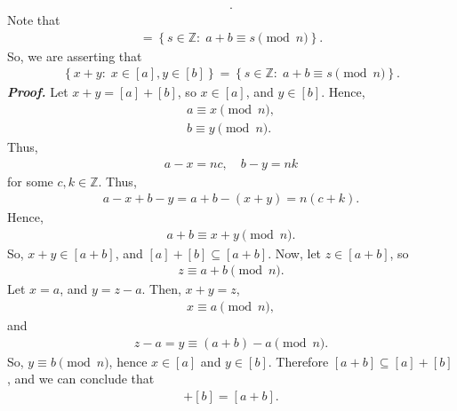 \documentclass{report}
\begin{document}
\begin{itemize}
\begin{align*}
            .\end{align*}
            Note that 
            \begin{align*}
                [a + b] = \left\{s \in \mathbb{Z}:\; a + b \equiv s \pmod{n}\right\}
            .\end{align*}
            So, we are asserting that 
            \begin{align*}
                \left\{x + y:\; x \in [a], y \in [b]\right\} = \left\{s \in \mathbb{Z}:\; a + b \equiv s \pmod{n}\right\}
            .\end{align*}
            \bigbreak \noindent 
            \textbf{\textit{Proof.}} Let $x+y = [a] + [b]$, so $x \in [a]$, and $y \in [b]$. Hence, 
            \begin{align*}
                a \equiv x \pmod{n}, \\
                b \equiv y \pmod{n}
            .\end{align*}
            Thus,
            \begin{align*}
                a - x = nc, \quad b - y = nk
            \end{align*}
            for some $c,k \in \mathbb{Z}$. Thus,
            \begin{align*}
                a - x + b -y = a+b-(x+y) = n(c+k)
            .\end{align*}
            Hence, 
            \begin{align*}
                a+b \equiv x+y \pmod{n}
            .\end{align*}
            So, $x+y \in [a+b]$, and $[a] + [b] \subseteq [a+b]$. Now, let $z \in [a+b]$, so
            \begin{align*}
                z \equiv a + b \pmod{n}
            .\end{align*}
            Let $x = a$, and $y = z-a$. Then, $x + y = z$, 
            \begin{align*}
                x \equiv a \pmod{n}
            ,\end{align*}
            and 
            \begin{align*}
                z-a = y \equiv (a+b) - a \pmod{n}
            .\end{align*}
            So, $y \equiv b \pmod{n}$, hence $x\in[a]$ and $y \in [b]$. Therefore $[a+b] \subseteq [a] + [b]$, and we can conclude that
            \begin{align*}
                [a] + [b] = [a+b]
            .\end{align*}

\end{itemize}
\end{document}
